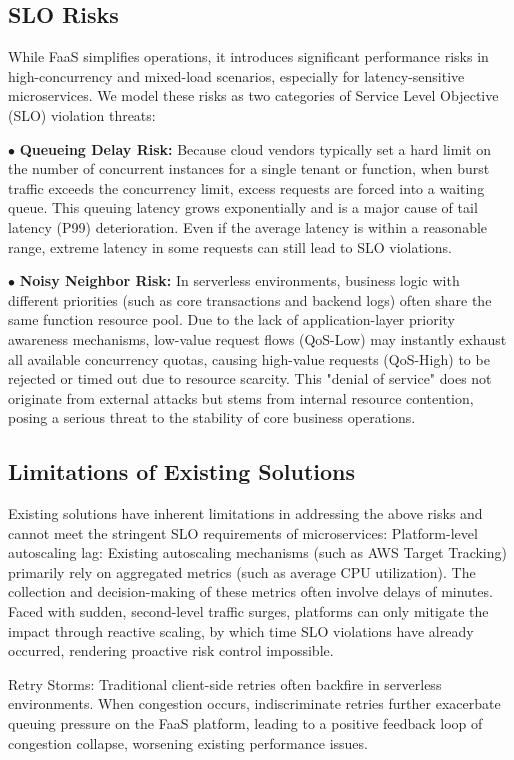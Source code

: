 \documentclass[journal]{IEEEtran}
\begin{document}
\subsection{SLO Risks}
While FaaS simplifies operations, it introduces significant performance risks in high-concurrency and mixed-load scenarios, especially for latency-sensitive microservices. We model these risks as two categories of Service Level Objective (SLO) violation threats:

$\bullet$ \textbf{Queueing Delay Risk:} Because cloud vendors typically set a hard limit on the number of concurrent instances for a single tenant or function, when burst traffic exceeds the concurrency limit, excess requests are forced into a waiting queue. This queuing latency grows exponentially and is a major cause of tail latency (P99) deterioration. Even if the average latency is within a reasonable range, extreme latency in some requests can still lead to SLO violations.

$\bullet$ \textbf{Noisy Neighbor Risk:} In serverless environments, business logic with different priorities (such as core transactions and backend logs) often share the same function resource pool. Due to the lack of application-layer priority awareness mechanisms, low-value request flows (QoS-Low) may instantly exhaust all available concurrency quotas, causing high-value requests (QoS-High) to be rejected or timed out due to resource scarcity. This "denial of service" does not originate from external attacks but stems from internal resource contention, posing a serious threat to the stability of core business operations.

\subsection{Limitations of Existing Solutions}
Existing solutions have inherent limitations in addressing the above risks and cannot meet the stringent SLO requirements of microservices: Platform-level autoscaling lag: Existing autoscaling mechanisms (such as AWS Target Tracking) primarily rely on aggregated metrics (such as average CPU utilization). The collection and decision-making of these metrics often involve delays of minutes. Faced with sudden, second-level traffic surges, platforms can only mitigate the impact through reactive scaling, by which time SLO violations have already occurred, rendering proactive risk control impossible.

Retry Storms: Traditional client-side retries often backfire in serverless environments. When congestion occurs, indiscriminate retries further exacerbate queuing pressure on the FaaS platform, leading to a positive feedback loop of congestion collapse, worsening existing performance issues.
\end{document}
